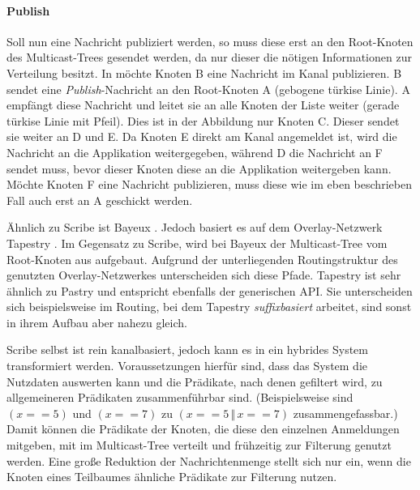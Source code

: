 \paragraph{Publish}
Soll nun eine Nachricht publiziert werden, so muss diese erst an den Root-Knoten des Multicast-Trees gesendet werden, da nur dieser die nötigen Informationen zur Verteilung besitzt. In  möchte Knoten B eine Nachricht im Kanal publizieren. B sendet eine \emph{Publish}-Nachricht an den Root-Knoten A (gebogene türkise Linie). A empfängt diese Nachricht und leitet sie an alle Knoten der Liste weiter (gerade türkise Linie mit Pfeil). Dies ist in der Abbildung nur Knoten C. Dieser sendet sie weiter an D und E. Da Knoten E direkt am Kanal angemeldet ist, wird die Nachricht an die Applikation weitergegeben, während D die Nachricht an F sendet muss, bevor dieser Knoten diese an die Applikation weitergeben kann. Möchte Knoten F eine Nachricht publizieren, muss diese wie im eben beschrieben Fall auch erst an A geschickt werden.

Ähnlich zu Scribe ist Bayeux \cite{Zhuang2001}. Jedoch basiert es auf dem Overlay-Netzwerk Tapestry \cite{Zhao2004Tapestry}. Im Gegensatz zu Scribe, wird bei Bayeux der Multicast-Tree vom Root-Knoten aus aufgebaut. Aufgrund der unterliegenden Routingstruktur des genutzten Overlay-Netzwerkes unterscheiden sich diese Pfade. Tapestry ist sehr ähnlich zu Pastry und entspricht ebenfalls der generischen API. Sie unterscheiden sich beispielsweise im Routing, bei dem Tapestry \emph{suffixbasiert} arbeitet, sind sonst in ihrem Aufbau aber nahezu gleich.

Scribe selbst ist rein kanalbasiert, jedoch kann es in ein hybrides System transformiert werden. Voraussetzungen hierfür sind, dass das System die Nutzdaten auswerten kann und die Prädikate, nach denen gefiltert wird, zu allgemeineren Prädikaten zusammenführbar sind. (Beispielsweise sind $(x == 5)$ und $(x == 7)$ zu $(x == 5\,\Vert\,x == 7)$ zusammengefassbar.) Damit können die Prädikate der Knoten, die diese den einzelnen Anmeldungen mitgeben, mit im Multicast-Tree verteilt und frühzeitig zur Filterung genutzt werden. Eine große Reduktion der Nachrichtenmenge stellt sich nur ein, wenn die Knoten eines Teilbaumes ähnliche Prädikate zur Filterung nutzen.
